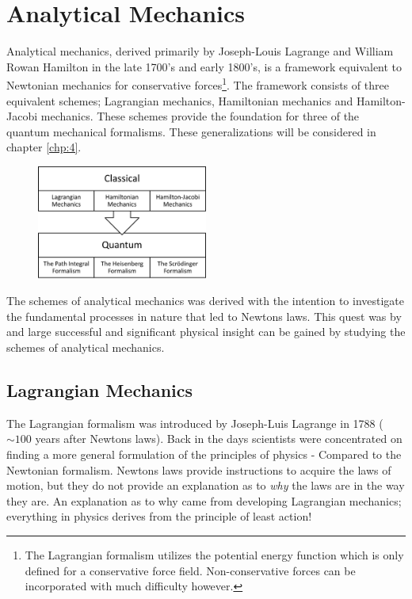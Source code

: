 \chapter{Analytical Mechanics}
Analytical mechanics, derived primarily by Joseph-Louis Lagrange and William Rowan Hamilton in the late 1700's and early 1800's, is a framework equivalent to Newtonian mechanics for conservative forces\footnote{The Lagrangian formalism utilizes the potential energy function which is only defined for a conservative force field. Non-conservative forces can be incorporated with much difficulty however.}. The framework consists of three equivalent schemes; Lagrangian mechanics, Hamiltonian mechanics and Hamilton-Jacobi mechanics. These schemes provide the foundation for three of the quantum mechanical formalisms. These generalizations will be considered in chapter \ref{chp:4}. 
\begin{figure}[h]
	\captionsetup{width=1\textwidth}
	\centering
	\includegraphics[width=0.5\textwidth]{figures/Billede1}
\end{figure}
The schemes of analytical mechanics was derived with the intention to investigate the fundamental processes in nature that led to Newtons laws. This quest was by and large successful and significant physical insight can be gained by studying the schemes of analytical mechanics. 

\section{Lagrangian Mechanics}
The Lagrangian formalism was introduced by Joseph-Luis Lagrange in 1788 ($\sim100$ years after Newtons laws). Back in the days scientists were concentrated on finding a more general formulation of the principles of physics - Compared to the Newtonian formalism. Newtons laws provide instructions to acquire the laws of motion, but they do not provide an explanation as to \emph{why} the laws are in the way they are. An explanation as to why came from developing Lagrangian mechanics; everything in physics derives from the principle of least action! 

